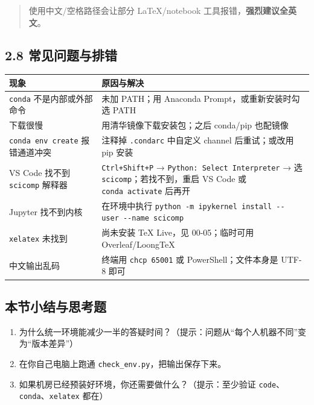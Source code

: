\begin{quote}
使用中文/空格路径会让部分 LaTeX/notebook
工具报错，\textbf{强烈建议全英文}。
\end{quote}

\subsection{2.8
常见问题与排错}\label{ux5e38ux89c1ux95eeux9898ux4e0eux6392ux9519}

{\def\LTcaptype{none} %
\begin{longtable}[]{@{}
  >{\raggedright\arraybackslash}p{}
  >{\raggedright\arraybackslash}p{}@{}}
\toprule\noalign{}
\begin{minipage}[b]{\linewidth}\raggedright
现象
\end{minipage} & \begin{minipage}[b]{\linewidth}\raggedright
原因与解决
\end{minipage} \\
\midrule\noalign{}
\endhead
\bottomrule\noalign{}
\endlastfoot
\texttt{conda} 不是内部或外部命令 & 未加 PATH；用 Anaconda
Prompt，或重新安装时勾选 PATH \\
下载很慢 & 用清华镜像下载安装包；之后 conda/pip 也配镜像 \\
\texttt{conda\ env\ create} 报错通道冲突 & 注释掉 \texttt{.condarc}
中自定义 channel 后重试；或改用 pip 安装 \\
VS Code 找不到 \texttt{scicomp} 解释器 & \texttt{Ctrl+Shift+P} →
\texttt{Python:\ Select\ Interpreter} → 选
\texttt{scicomp}；若找不到，重启 VS Code 或 \texttt{conda\ activate}
后再开 \\
Jupyter 找不到内核 & 在环境中执行
\texttt{python\ -m\ ipykernel\ install\ -\/-user\ -\/-name\ scicomp} \\
\texttt{xelatex} 未找到 & 尚未安装 TeX Live，见 00-05；临时可用
Overleaf/LoongTeX \\
中文输出乱码 & 终端用 \texttt{chcp\ 65001} 或 PowerShell；文件本身是
UTF-8 即可 \\
\end{longtable}
}

\subsection{本节小结与思考题}\label{ux672cux8282ux5c0fux7ed3ux4e0eux601dux8003ux9898-1}

\begin{enumerate}
\def\labelenumi{\arabic{enumi}.}
\tightlist
\item
  为什么统一环境能减少一半的答疑时间？（提示：问题从``每个人机器不同''变为``版本差异''）
\item
  在你自己电脑上跑通 \texttt{check\_env.py}，把输出保存下来。
\item
  如果机房已经预装好环境，你还需要做什么？（提示：至少验证
  \texttt{code}、\texttt{conda}、\texttt{xelatex} 都在）
\end{enumerate}

